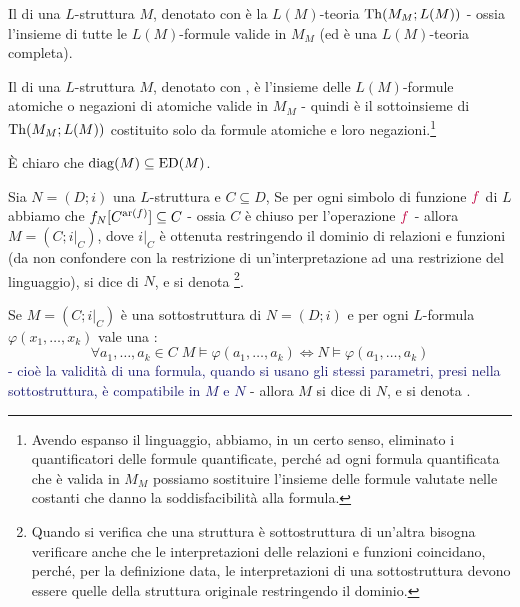 \begin{definition}
    Il  di una $L$-struttura $M$, denotato con  è la $L(M)$-teoria $\operatorname{Th}(M_M;L(M))$ - ossia l'insieme di tutte le $L(M)$-formule valide in $M_M$ (ed è una $L(M)$-teoria completa).
\end{definition}

\begin{definition}
    Il  di una $L$-struttura $M$, denotato con , è l'insieme delle $L(M)$-formule atomiche o negazioni di atomiche valide in $M_M$ - quindi è il sottoinsieme di $\operatorname{Th}(M_M;L(M))$ costituito solo da formule atomiche e loro negazioni.\footnote{Avendo espanso il linguaggio, abbiamo, in un certo senso, eliminato i quantificatori delle formule quantificate, perché ad ogni formula quantificata che è valida in $M_M$ possiamo sostituire l'insieme delle formule valutate nelle costanti che danno la soddisfacibilità alla formula.}
\end{definition}

\begin{remark}
    È chiaro che $\operatorname{diag}(M) \subseteq \operatorname{ED}(M)$.
\end{remark}

\begin{definition}[Sottostruttura]
    Sia $N = (D;i)$ una $L$-struttura e $C \subseteq D$, Se per ogni simbolo di funzione $\textcolor{purple}{f}$ di $L$ abbiamo che $f_N[C^{\operatorname{ar}(f)}] \subseteq C$ - ossia $C$ è chiuso per l'operazione $\textcolor{purple}{f}$ - allora $M = (C;i|_C)$,
    dove $i|_C$ è ottenuta restringendo il dominio di relazioni e funzioni (da non confondere con la restrizione di un'interpretazione ad una restrizione del linguaggio), si dice  di $N$, e si denota \footnote{Quando si verifica che una struttura è sottostruttura di un'altra bisogna verificare anche che le interpretazioni delle relazioni e funzioni coincidano, perché, per la definizione data,
    le interpretazioni di una sottostruttura devono essere quelle della struttura originale restringendo il dominio.}.
\end{definition}

\begin{definition}
    Se $M = (C;i|_C)$ è una sottostruttura di $N = (D;i)$ e per ogni $L$-formula $\varphi(x_1,\ldots,x_k)$ vale una :
    \[ \forall a_1,\ldots,a_k \in C \; M \models \varphi(a_1,\ldots,a_k) \iff N \models \varphi(a_1,\ldots,a_k)
    \]
    \textcolor{MidnightBlue}{- cioè la validità di una formula, quando si usano gli stessi parametri, presi nella sottostruttura, è compatibile in $M$ e $N$} - allora $M$ si dice  di $N$, e si denota .
\end{definition}

